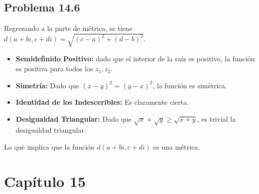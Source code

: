 \documentclass[conference]{IEEEtran}
\begin{document}
\subsection{Problema 14.6}
Regresando a la parte de métrica, se tiene $d(a+bi,c+di) = \sqrt{(c-a)^2 + (d-b)^2}$. 
\begin{itemize}
	\item \textbf{Semidefinido Positivo:} dado que el interior de la raíz es positivo, la función es positiva para todos los $z_1 ,z_2$.
	\item \textbf{Simetría:} Dado que $(x-y)^2 = (y-x)^2$, la función es simétrica.
	\item \textbf{Identidad de los Indesceribles:} Es claramente cierta.
	\item \textbf{Desigualdad Triangular:} Dado que $\sqrt{x} + \sqrt{y} \geq \sqrt{x+y}$, es trivial la desigualdad triangular.
\end{itemize}
Lo que implica que la función $d(a+bi,c+di)$ es una métrica.










\section{Capítulo 15}
\end{document}

